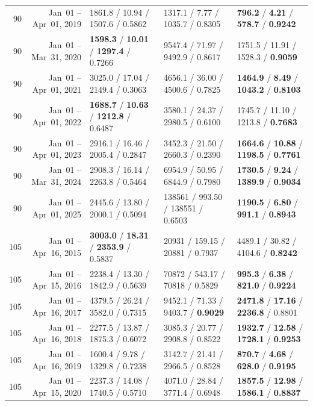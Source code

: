 \begin{longtable}{r r l l l}
90 & Jan~01 -- Apr~01, 2019 & 1861.8 / 10.94 / 1507.6 / 0.5862 & 1317.1 / 7.77 / 1035.7 / 0.8305 & \textbf{796.2} / \textbf{4.21} / \textbf{578.7} / \textbf{0.9242} \\
90 & Jan~01 -- Mar~31, 2020 & \textbf{1598.3} / \textbf{10.01} / \textbf{1297.4} / 0.7266 & 9547.4 / 71.97 / 9492.9 / 0.8617 & 1751.5 / 11.91 / 1528.3 / \textbf{0.9059} \\
90 & Jan~01 -- Apr~01, 2021 & 3025.0 / 17.04 / 2149.4 / 0.3063 & 4656.1 / 36.00 / 4500.6 / 0.7825 & \textbf{1464.9} / \textbf{8.49} / \textbf{1043.2} / \textbf{0.8103} \\
90 & Jan~01 -- Apr~01, 2022 & \textbf{1688.7} / \textbf{10.63} / \textbf{1212.8} / 0.6487 & 3580.1 / 24.37 / 2980.5 / 0.6100 & 1745.7 / 11.10 / 1213.8 / \textbf{0.7683} \\
90 & Jan~01 -- Apr~01, 2023 & 2916.1 / 16.46 / 2005.4 / 0.2847 & 3452.3 / 21.50 / 2660.3 / 0.2390 & \textbf{1664.6} / \textbf{10.88} / \textbf{1198.5} / \textbf{0.7761} \\
90 & Jan~01 -- Mar~31, 2024 & 2908.3 / 16.14 / 2263.8 / 0.5464 & 6954.9 / 50.95 / 6844.9 / 0.7980 & \textbf{1730.5} / \textbf{9.24} / \textbf{1389.9} / \textbf{0.9034} \\
90 & Jan~01 -- Apr~01, 2025 & 2445.6 / 13.80 / 2000.1 / 0.5094 & 138561 / 993.50 / 138551 / 0.6503 & \textbf{1190.5} / \textbf{6.80} / \textbf{991.1} / \textbf{0.8943} \\
\midrule
105 & Jan~01 -- Apr~16, 2015 & \textbf{3003.0} / \textbf{18.31} / \textbf{2353.9} / 0.5837 & 20931 / 159.15 / 20881 / 0.7937 & 4489.1 / 30.82 / 4104.6 / \textbf{0.8242} \\
105 & Jan~01 -- Apr~15, 2016 & 2238.4 / 13.30 / 1842.9 / 0.5639 & 70872 / 543.17 / 70818 / 0.5829 & \textbf{995.3} / \textbf{6.38} / \textbf{821.0} / \textbf{0.9224} \\
105 & Jan~01 -- Apr~16, 2017 & 4379.5 / 26.24 / 3582.0 / 0.7315 & 9452.1 / 71.33 / 9403.7 / \textbf{0.9029} & \textbf{2471.8} / \textbf{17.16} / \textbf{2236.8} / 0.8801 \\
105 & Jan~01 -- Apr~16, 2018 & 2277.5 / 13.87 / 1875.3 / 0.6072 & 3085.3 / 20.77 / 2908.8 / 0.8522 & \textbf{1932.7} / \textbf{12.58} / \textbf{1728.1} / \textbf{0.9253} \\
105 & Jan~01 -- Apr~16, 2019 & 1600.4 / 9.78 / 1329.8 / 0.7238 & 3142.7 / 21.41 / 2966.5 / 0.8528 & \textbf{870.7} / \textbf{4.68} / \textbf{628.0} / \textbf{0.9195} \\
105 & Jan~01 -- Apr~15, 2020 & 2237.3 / 14.08 / 1740.5 / 0.5710 & 4071.0 / 28.84 / 3771.4 / 0.6948 & \textbf{1857.5} / \textbf{12.98} / \textbf{1586.1} / \textbf{0.8837} \\

\end{longtable}
